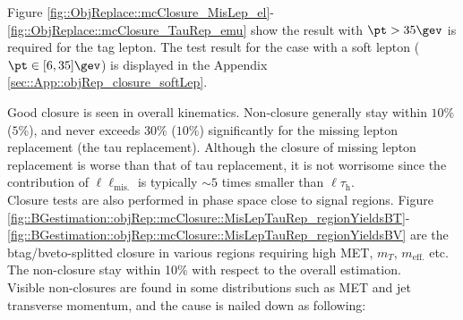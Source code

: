 Figure \ref{fig::ObjReplace::mcClosure_MisLep_el}-\ref{fig::ObjReplace::mcClosure_TauRep_emu} show the result with $\pt>35\gev$ is required for the tag lepton. The test result for the case with a soft lepton ($\pt\in[6,35]\gev$) is displayed in the Appendix \ref{sec::App::objRep_closure_softLep}. 

Good closure is seen in overall kinematics. Non-closure generally stay within $10\%$ ($5\%$), and never exceeds $30\%$ ($10\%$) significantly for the missing lepton replacement (the tau replacement).
Although the closure of missing lepton replacement is worse than that of tau replacement, it is not worrisome since the contribution of $\ell\ell_{\mathrm{mis.}}$ is typically $\sim5$ times smaller than $\ell\tau_{\mathrm{h}}$. \\

Closure tests are also performed in phase space close to signal regions. 
Figure \ref{fig::BGestimation::objRep::mcClosure::MisLepTauRep_regionYieldsBT}-\ref{fig::BGestimation::objRep::mcClosure::MisLepTauRep_regionYieldsBV} 
are the btag/bveto-splitted closure in various regions requiring high MET, $m_{T}$, $m_{\mathrm{eff.}}$ etc. The non-closure stay within 10$\%$ with respect to the overall estimation.\\









\clearpage
Visible non-closures are found in some distributions such as MET and jet transverse momentum, and the cause is nailed down as following:

